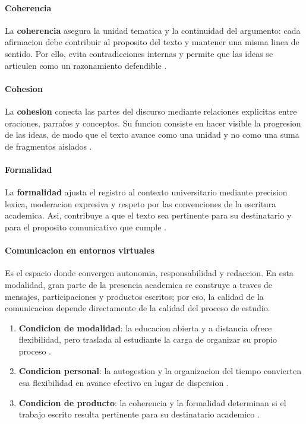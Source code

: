 \documentclass[
	spanish,
	letterpaper, oneside
]{article}
\begin{document}
\paragraph{\textbf{Coherencia}}
La \textbf{coherencia} asegura la unidad tematica y la continuidad del argumento: cada afirmacion debe contribuir al proposito del texto y mantener una misma linea de sentido. Por ello, evita contradicciones internas y permite que las ideas se articulen como un razonamiento defendible \citep{nunezcortesEscrituraAcademicaTeoria2015}.

\paragraph{\textbf{Cohesion}}
La \textbf{cohesion} conecta las partes del discurso mediante relaciones explicitas entre oraciones, parrafos y conceptos. Su funcion consiste en hacer visible la progresion de las ideas, de modo que el texto avance como una unidad y no como una suma de fragmentos aislados \citep{correaManualBasicoEscritura2018}.

\paragraph{\textbf{Formalidad}}
La \textbf{formalidad} ajusta el registro al contexto universitario mediante precision lexica, moderacion expresiva y respeto por las convenciones de la escritura academica. Asi, contribuye a que el texto sea pertinente para su destinatario y para el proposito comunicativo que cumple \citep{nunezcortesEscrituraAcademicaTeoria2015,correaManualBasicoEscritura2018}.

\paragraph{Comunicacion en entornos virtuales}
Es el espacio donde convergen autonomia, responsabilidad y redaccion. En esta modalidad, gran parte de la presencia academica se construye a traves de mensajes, participaciones y productos escritos; por eso, la calidad de la comunicacion depende directamente de la calidad del proceso de estudio.

\begin{enumerate}
  \item \textbf{Condicion de modalidad}: la educacion abierta y a distancia ofrece flexibilidad, pero traslada al estudiante la carga de organizar su propio proceso \citep{vitoriaEscrituraAcademicaFormacion2019}.
  \item \textbf{Condicion personal}: la autogestion y la organizacion del tiempo convierten esa flexibilidad en avance efectivo en lugar de dispersion \citep{correaManualBasicoEscritura2018}.
  \item \textbf{Condicion de producto}: la coherencia y la formalidad determinan si el trabajo escrito resulta pertinente para su destinatario academico \citep{nunezcortesEscrituraAcademicaTeoria2015}.
\end{enumerate}
\end{document}
